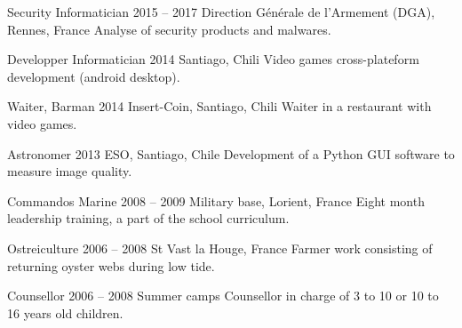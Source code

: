 \begin{joblist}

\item[Security Informatician]{2015 -- 2017}
	{Direction Générale de l'Armement (DGA), Rennes, France}
	{Analyse of security products and malwares.}

\item[Developper Informatician]{2014}
	{Santiago, Chili}
	{Video games cross-plateform development (android desktop).}

\item[Waiter, Barman]{2014}
	{Insert-Coin, Santiago, Chili}
	{Waiter in a restaurant with video games.}

\item[Astronomer]{2013}
	{ESO, Santiago, Chile}
	{Development of a Python GUI software to measure image quality.}

\item[Commandos Marine]{2008 -- 2009}
	{Military base, Lorient, France}
	{Eight ­month leadership training, a part of the school curriculum.}

\item[Ostreiculture]{2006 -- 2008}
	{St Vast la Houge, France}
	{Farmer work consisting of returning oyster webs during low tide.}


\item[Counsellor]{2006 -- 2008}
	{Summer camps}
	{Counsellor in charge of 3 to 10 or 10 to 16 years old children.}
\end{joblist}


\begin{skilllist}



\end{skilllist}

